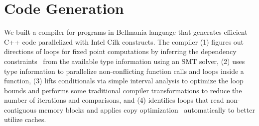 \section{Code Generation}
\label{codegen}

We built a compiler for programs in Bellmania language that generates efficient C++ code parallelized with Intel Cilk constructs. The compiler (1) figures out directions of loops for fixed point computations by inferring the dependency constraints~\cite{JACM67/Karp} from the available type information using an SMT solver, (2) uses type information to parallelize non-conflicting function calls and loops inside a function, (3) lifts conditionals via simple interval analysis to optimize the loop bounds and performs some traditional compiler transformations to reduce the number of iterations and comparisons, and (4) identifies loops that read non-contiguous memory blocks and applies copy optimization~\cite{ASPLOS91/Lam} automatically to better utilize caches.

 

